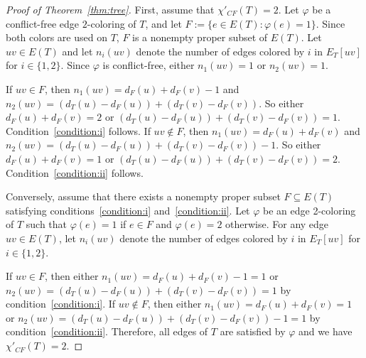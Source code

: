 \documentclass[10pt,a4paper]{amsart}
\begin{document}
\begin{proof}[Proof of Theorem~\ref{thm:tree}]
First, assume that $\chi'_{CF}(T)=2$. Let $\varphi$
be a conflict-free edge $2$-coloring of $T$, and let $F:=\{e\in E(T)\colon \varphi(e)=1\}$.
Since both colors are used on $T$, $F$ is a nonempty proper subset of $E(T)$.
Let $uv\in E(T)$ and let $n_i(uv)$ denote the number of edges colored by $i$ in $E_T[uv]$ for $i\in\{1,2\}$.
Since $\varphi$ is conflict-free, either $n_1(uv)=1$ or $n_2(uv)=1$.

If $uv\in F$, then $n_1(uv)=d_F(u)+d_F(v)-1$ and $n_2(uv)=(d_T(u)-d_F(u))+(d_T(v)-d_F(v))$. So either $d_F(u)+d_F(v)=2$ or $(d_T(u)-d_F(u))+(d_T(v)-d_F(v))=1$. Condition~\ref{condition:i} follows.
If $uv\notin F$, then $n_1(uv)=d_F(u)+d_F(v)$ and $n_2(uv)=(d_T(u)-d_F(u))+(d_T(v)-d_F(v))-1$. So either $d_F(u)+d_F(v)=1$ or $(d_T(u)-d_F(u))+(d_T(v)-d_F(v))=2$. Condition~\ref{condition:ii} follows.


Conversely, assume that there exists a nonempty proper subset $F\subseteq E(T)$ satisfying conditions~\ref{condition:i} and~\ref{condition:ii}. Let $\varphi$ be an edge 2-coloring of $T$ such that $\varphi(e)=1$ if $e\in F$ and $\varphi(e)=2$ otherwise.
For any edge $uv\in E(T)$, let $n_i(uv)$ denote the number of edges colored by $i$ in $E_T[uv]$ for $i\in\{1,2\}$.

If $uv\in F$, then either $n_1(uv)=d_F(u)+d_F(v)-1=1$ or $n_2(uv)=(d_T(u)-d_F(u))+(d_T(v)-d_F(v))=1$ by condition~\ref{condition:i}.
If $uv\notin F$, then  either $n_1(uv)=d_F(u)+d_F(v)=1$ or $n_2(uv)=(d_T(u)-d_F(u))+(d_T(v)-d_F(v))-1=1$ by condition~\ref{condition:ii}.
Therefore, all edges of $T$ are satisfied by $\varphi$ and we have $\chi'_{CF}(T)=2$.
\end{proof}
\end{document}
